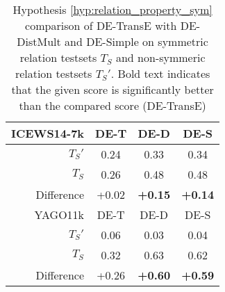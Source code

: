 \begin{table}[htb]
\centering
\begin{minipage}{\columnwidthcaption}
\centering
\caption{Hypothesis \autoref{hyp:relation_property_sym} comparison of DE-TransE with DE-DistMult and DE-Simple on symmetric relation testsets $T_S$ and non-symmeric relation testsets $T_S'$. Bold text indicates that the given score is significantly better than the compared score (DE-TransE)}
\vspace{-3mm}

\begin{tabular}{r|ccc}\hline
\mbox{ICEWS14-7k} & DE-T & DE-D & DE-S \\ \hline
$T_S'$ & 0.24 & 0.33 & 0.34 \\
$T_S$ & 0.26 & 0.48 & 0.48 \\ \hline
Difference & +0.02 & \textbf{+0.15} & \textbf{+0.14} \\ \hline\hline
YAGO11k & DE-T & DE-D & DE-S \\ \hline
$T_S'$ & 0.06 & 0.03 & 0.04 \\
$T_S$ & 0.32 & 0.63 & 0.62 \\ \hline
Difference & +0.26 & \textbf{+0.60} & \textbf{+0.59} \\
 \hline
\end{tabular}

\label{tab:hypothesis_3_a_comparison}
\end{minipage}
\end{table}

